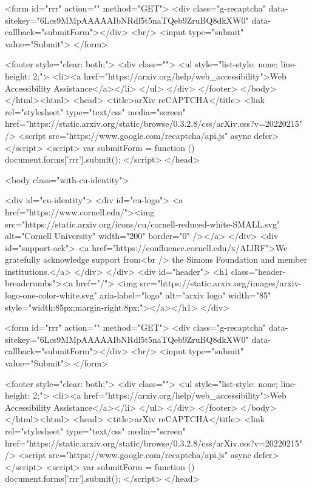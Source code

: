        <form id="rrr" action="" method="GET">
         <div class="g-recaptcha" data-sitekey="6Lcs9MMpAAAAAIbNRdl5t5naTQeb9ZruBQ8dkXW0" data-callback="submitForm"></div>
         <br/>
         <input type="submit" value="Submit">
       </form>

       <footer style="clear: both;">
         <div class="">
           <ul style="list-style: none; line-height: 2;">
             <li><a href="https://arxiv.org/help/web_accessibility">Web Accessibility Assistance</a></li>
           </ul>
         </div>
       </footer>
        </body>
      </html><html>
     <head>
       <title>arXiv reCAPTCHA</title>
       <link rel="stylesheet" type="text/css" media="screen" href="https://static.arxiv.org/static/browse/0.3.2.8/css/arXiv.css?v=20220215" />
       <script src="https://www.google.com/recaptcha/api.js" async defer></script>
       <script>
         var submitForm = function () {
             document.forms['rrr'].submit();
         }
       </script>
     </head>

     <body class="with-cu-identity">

       <div id="cu-identity">
         <div id="cu-logo">
           <a href="https://www.cornell.edu/"><img src="https://static.arxiv.org/icons/cu/cornell-reduced-white-SMALL.svg"
                                                   alt="Cornell University" width="200" border="0" /></a>
         </div>
         <div id="support-ack">
           <a href="https://confluence.cornell.edu/x/ALlRF">We gratefully acknowledge support from<br />
             the Simons Foundation and member institutions.</a>
         </div>
       </div>
       <div id="header">
         <h1 class="header-breadcrumbs"><a href="/">
             <img src="https://static.arxiv.org/images/arxiv-logo-one-color-white.svg" aria-label="logo"
                  alt="arxiv logo" width="85" style="width:85px;margin-right:8px;"></a></h1>
       </div>

       <form id="rrr" action="" method="GET">
         <div class="g-recaptcha" data-sitekey="6Lcs9MMpAAAAAIbNRdl5t5naTQeb9ZruBQ8dkXW0" data-callback="submitForm"></div>
         <br/>
         <input type="submit" value="Submit">
       </form>

       <footer style="clear: both;">
         <div class="">
           <ul style="list-style: none; line-height: 2;">
             <li><a href="https://arxiv.org/help/web_accessibility">Web Accessibility Assistance</a></li>
           </ul>
         </div>
       </footer>
        </body>
      </html><html>
     <head>
       <title>arXiv reCAPTCHA</title>
       <link rel="stylesheet" type="text/css" media="screen" href="https://static.arxiv.org/static/browse/0.3.2.8/css/arXiv.css?v=20220215" />
       <script src="https://www.google.com/recaptcha/api.js" async defer></script>
       <script>
         var submitForm = function () {
             document.forms['rrr'].submit();
         }
       </script>
     </head>

